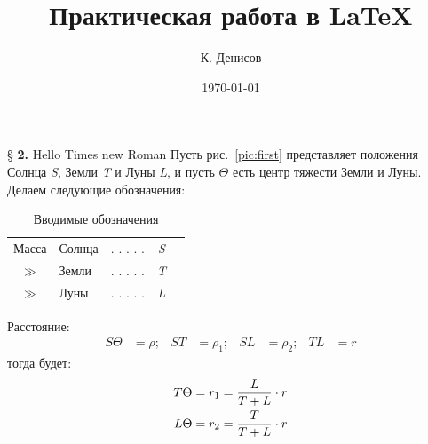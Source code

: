 \documentclass[a4paper,12pt]{article} %
\author {К. Денисов}
\title {Практическая работа в \LaTeX{} \textnumero1}
\date {\today}
\begin{document}
\maketitle

\S{} \textbf{2. }Hello Times new Roman Пусть рис.~\ref{pic:first} представляет положения Солнца \textit{S}, Земли \textit{T} и Луны \textit{L}, и пусть $\Theta$ есть центр тяжести Земли и Луны. Делаем следующие обозначения:
\begin{table}[!h]
	\begin {center}
		\caption{Вводимые обозначения}\label{tab:terms}
		\begin{tabular}{clccl}
			Масса & Солнца & . . . . . & \textit{S} \\
			$\gg$ & Земли  & . . . . . & \textit{T} \\
			$\gg$ & Луны   & . . . . . & \textit{L}			
		\end{tabular}
	\end {center}
\end {table}

Расстояние:
\begin {equation*}
	\begin{aligned}
		S\Theta &= \rho; & ST &= \rho_{1}; & SL &= \rho_{2}; & TL &= r
	\end{aligned}
\end {equation*}
тогда будет:
\begin {equation}
	\begin{aligned}
		T\Theta = r_{1} &= \frac{L}{T+L} \cdot r \\ 
		L\Theta = r_{2} &= \frac{T}{T+L} \cdot r
	\end{aligned}
	\vspace{4ex}
\end {equation}
\end{document}
